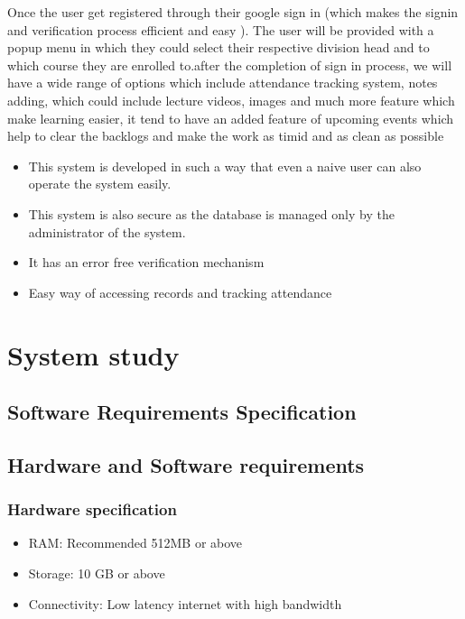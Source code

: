 \documentclass{article}
\begin{document}
\Large
Once the user get registered through their google sign in (which makes the signin and verification process efficient and easy ). The user will be provided with a popup menu in which they could select their respective division head and to which course they are enrolled to.after the completion of sign in process, we will have a wide range of options which include attendance tracking system, notes adding, which could include lecture videos, images and much more feature which make learning easier, it tend to have an added feature of upcoming events which help to clear the backlogs and make the work as timid and as clean as possible\\

\begin{itemize}
\item This system is developed in such a way that even a naive user can also operate the system easily.
\item This system is also secure as the database is managed only by
the administrator of the system.
\item It has an error free verification mechanism
\item Easy way of accessing records and tracking attendance
\end{itemize}


\newpage

\section{System study}
\vspace{1em}

\subsection{Software Requirements Specification}
\vspace{1em}
\subsection{Hardware and Software requirements}
\vspace{1em}
\subsubsection{Hardware specification}
\vspace{1em}
\begin{itemize}
\item RAM: Recommended 512MB or above
\item Storage: 10 GB or above
\item Connectivity: Low latency internet with high bandwidth
\end{itemize}
\end{document}
